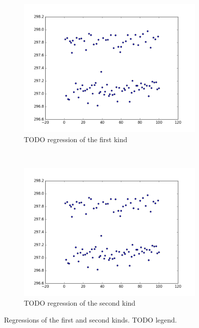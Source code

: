\documentclass[conference]{IEEEtran}
\begin{document}
\begin{figure}
\centering

\begin{subfigure}{0.22\textwidth}
    \centering
    \includegraphics[width=\textwidth]{experiments/images/mean_repeated_branchsum}
    \caption{TODO regression of the first kind}
\end{subfigure}%
~
\begin{subfigure}{0.22\textwidth}
    \centering
    \includegraphics[width=\textwidth]{experiments/images/mean_repeated_branchsum}
    \caption{TODO regression of the second kind}
\end{subfigure}

\caption{Regressions of the first and second kinds. TODO legend.}
\label{fig:regressionkinds}
\end{figure}
\end{document}
